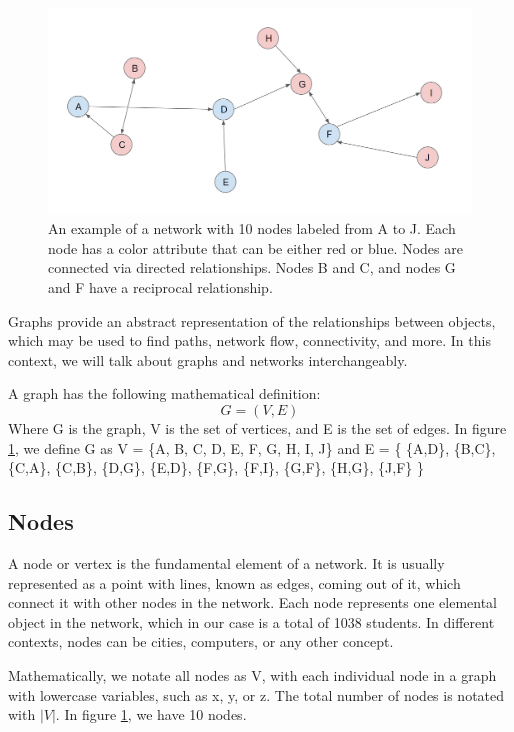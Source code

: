     \begin{figure}[H]
        \centering
            \includegraphics[width=0.7\linewidth]{figures/Networks/Concepts/directed.png} 
        \caption{An example of a network with 10 nodes labeled from A to J. Each node has a color attribute that can be either red or blue. Nodes are connected via directed relationships. Nodes B and C, and nodes G and F have a reciprocal relationship.}
        \label{figure:networkExampleBasic}
    \end{figure}

Graphs provide an abstract representation of the relationships between objects, which may be used to find paths, network flow, connectivity, and more. In this context, we will talk about graphs and networks interchangeably. 

A graph has the following mathematical definition: \label{eq:graph}
    \begin{equation}
        G = (V,E) 
    \end{equation}
Where G is the graph, V is the set of vertices, and E is the set of edges. In figure \ref{figure:networkExampleBasic}, we define G as V = \{A, B, C, D, E, F, G, H, I, J\} and E = \{ \{A,D\}, \{B,C\}, \{C,A\}, \{C,B\}, \{D,G\}, \{E,D\}, \{F,G\}, \{F,I\}, \{G,F\}, \{H,G\}, \{J,F\} \}

\subsection{ Nodes }

A node or vertex is the fundamental element of a network. It is usually represented as a point with lines, known as edges, coming out of it, which connect it with other nodes in the network. Each node represents one elemental object in the network, which in our case is a total of 1038 students. In different contexts, nodes can be cities, computers, or any other concept.

Mathematically, we notate all nodes as V, with each individual node in a graph with lowercase variables, such as x, y, or z. The total number of nodes is notated with $|V|$. In figure \ref{figure:networkExampleBasic}, we have 10 nodes.

